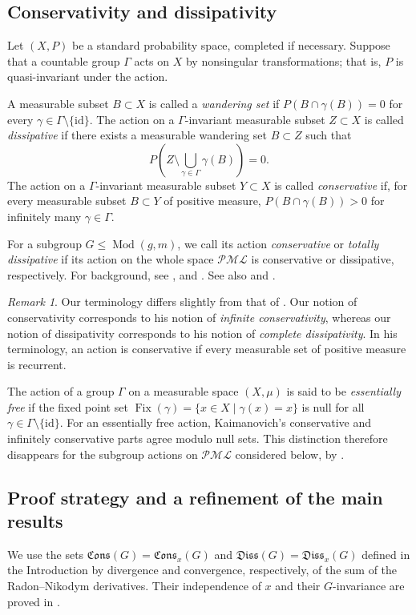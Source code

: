 \documentclass[dvipdfmx]{amsart}
\theoremstyle{remark}
\newtheorem{remark}{Remark}[section]
\newcommand{\tmod}{\operatorname{Mod}}
\newcommand{\pml}{\mathcal{PML}}
\newcommand{\conservativepart}{\mathfrak{Cons}}
\newcommand{\dissipativepart}{\mathfrak{Diss}}
\begin{document}
\subsection{Conservativity and dissipativity}
\label{subsec:conservativity_dissipativity}
Let $(X,P)$ be a standard probability space, completed if necessary.
Suppose that a countable group $\Gamma$ acts on $X$ by nonsingular
transformations; that is, $P$ is quasi-invariant under the action.

A measurable subset $B\subset X$ is called a \emph{wandering set} if $P(B\cap\gamma(B))=0$ for every $\gamma\in\Gamma\setminus\{\mathrm{id}\}$.
The action on a $\Gamma$-invariant measurable subset $Z\subset X$ is called \emph{dissipative} if there exists a measurable wandering set $B\subset Z$ such that
\[
P\left(Z\setminus\bigcup_{\gamma\in\Gamma}\gamma(B)\right)=0.
\]
The action on a $\Gamma$-invariant measurable subset $Y\subset X$ is called \emph{conservative} if, for every measurable subset $B\subset Y$ of positive measure, $P(B\cap\gamma(B))>0$ for infinitely many $\gamma\in\Gamma$.

For a subgroup $G\le\tmod(g,m)$, we call its action
\emph{conservative} or \emph{totally dissipative} if its action
on the whole space $\pml$ is conservative or dissipative,
respectively.
For background, see \cite{Pommerenke1976}, \cite{Sullivan1981} and \cite{Nicholls1989}. See also \cite{Kaimanovich2010} and \cite[Definition D11.3]{HubbardVol3_2022}.

\begin{remark}
Our terminology differs slightly from that of \cite{Kaimanovich2010}. Our notion of conservativity corresponds to his notion of \emph{infinite conservativity}, whereas our notion of dissipativity corresponds to his notion of \emph{complete dissipativity}. In his terminology, an action is conservative if every measurable set of positive measure is recurrent.
\end{remark}

The action of a group $\Gamma$ on a measurable space $(X,\mu)$ is said to be \emph{essentially free} if the fixed point set $\operatorname{Fix}(\gamma)=\{x\in X\mid \gamma(x)=x\}$ is null for all $\gamma\in \Gamma\setminus \{\mathrm{id}\}$.
For an essentially free action, Kaimanovich's conservative and infinitely conservative parts agree modulo null sets. This distinction therefore disappears for the subgroup actions on $\pml$ considered below, by .

\subsection{Proof strategy and a refinement of the main results}
\label{subsec:Main_resut_of_SectionDichotomy}
We use the sets $\conservativepart(G)=\conservativepart_x(G)$ and
$\dissipativepart(G)=\dissipativepart_x(G)$ defined in the Introduction
by divergence and convergence, respectively, of the sum of the
Radon--Nikodym derivatives. Their independence of $x$ and their
$G$-invariance are proved in .
\end{document}
